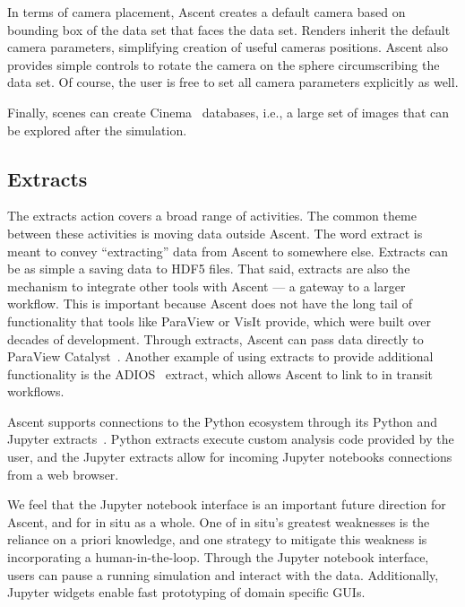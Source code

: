 In terms of camera placement,
Ascent creates a default camera based on bounding box of the data set 
that faces the data set.
%
Renders inherit the default camera parameters, simplifying creation of useful
cameras positions.
%
Ascent also provides simple controls to rotate the camera on the
sphere circumscribing the data set.
%
Of course, the user is free to set all
camera parameters explicitly as well.

Finally, scenes can create Cinema~\cite{AhrensCinema} databases, i.e.,
a large set of images that can be explored after the simulation.


\subsection{Extracts}
The extracts action covers a broad range of activities.
%
The common theme between these activities is moving data outside Ascent.
%
The word extract is meant to convey ``extracting'' data from Ascent to somewhere else.
%
%
%
Extracts can be as simple a saving data to HDF5 files.
%
That said, extracts are also the mechanism to integrate other tools with Ascent --- a gateway
to a larger workflow.
%
This is important because
Ascent does not have the long tail of functionality that tools like ParaView or VisIt provide, which
were built over decades of development.
%
Through extracts, Ascent can pass data directly to ParaView Catalyst~\cite{Catalyst}.
%
Another example of using extracts to provide additional functionality is the
ADIOS~\cite{Lofstead2008} extract, which allows Ascent to link to in transit workflows.

Ascent supports connections to the Python ecosystem through its Python and
Jupyter extracts~\cite{CyrusISAV,Jupyter}.
%
Python extracts execute custom analysis code provided by the user, and the
Jupyter extracts allow for incoming Jupyter notebooks connections from a web
browser.

We feel that the Jupyter notebook interface is an important future direction
for Ascent, and for in situ as a whole.
%
One of in situ's greatest weaknesses is the reliance on a priori
knowledge, and one strategy to mitigate this weakness is incorporating a human-in-the-loop.
%
Through the Jupyter notebook interface, users can pause a running simulation
and interact with the data.
%
Additionally, Jupyter widgets enable fast prototyping of domain specific GUIs.

